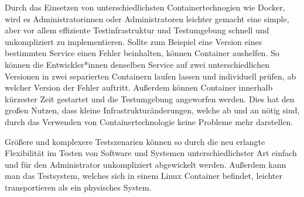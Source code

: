 
Durch das Einsetzen von unterschiedlichsten Containertechnogien wie Docker, wird es Administratorinnen oder Administratoren leichter gemacht eine simple, aber vor allem effiziente Testinfrastruktur und Testumgebung schnell und unkompliziert zu implementieren. Sollte zum Beispiel eine Version eines bestimmten Service einen Fehler beinhalten, können Container aushelfen. So können die Entwickler*innen denselben Service auf zwei unterschiedlichen Versionen in zwei separierten Containern laufen lassen und individuell prüfen, ab welcher Version der Fehler auftritt. Außerdem können Container innerhalb kürzester Zeit gestartet und die Testumgebung angeworfen werden. Dies hat den großen Nutzen, dass kleine Infrastrukturänderungen, welche ab und an nötig sind, durch das Verwenden von Containertechnologie keine Probleme mehr darstellen. \cite{TestenContainer}

Größere und komplexere Testszenarien können so durch die neu erlangte Flexibilität im Testen von Software und Systemen unterschiedlichster Art einfach und für den Administrator unkompliziert abgewickelt werden. Außerdem kann man das Testsystem, welches sich in einem Linux Container befindet, leichter transportieren als ein physisches System. \cite{TestenContainer}
